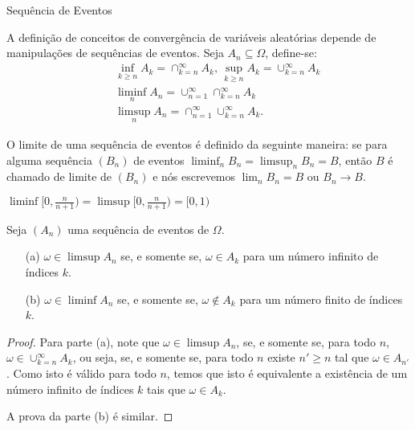 \begin{frame}
\begin{block}{Sequência de Eventos}
	
	A definição de conceitos de convergência de variáveis aleatórias
	depende de manipulações de sequências de eventos. Seja $A_n\subseteq
	\Omega$, define-se:
	\begin{eqnarray}
	& &\inf_{k\geq n} A_k=\cap_{k=n}^{\infty}A_k\mbox{, }\sup_{k\geq
		n}A_k=\cup_{k=n}^{\infty}A_k \nonumber \\ & &\liminf_{n}
	A_n=\cup_{n=1}^{\infty}\cap_{k=n}^{\infty}A_k \nonumber \\
	& & \limsup_{n} A_n=\cap_{n=1}^{\infty}\cup_{k=n}^{\infty}A_k.
	\nonumber
	\end{eqnarray}
	
\end{block}


\begin{block}{}
O limite de uma sequência de eventos é definido da seguinte maneira:
se para alguma sequência $(B_n)$ de eventos $\liminf_{n}
B_n=\limsup_{n} B_n=B$, então $B$ é chamado de limite de $(B_n)$ e
nós escrevemos $\lim_n B_n=B$ ou $B_n \rightarrow B$.
\end{block}

\begin{exem}
	$\liminf [0,\frac{n}{n+1})=\limsup [0,\frac{n}{n+1})=[0,1)$
\end{exem}

\end{frame}

\begin{frame}


\begin{teo} \label{thm:seqeve1} Seja $(A_n)$ uma sequência de eventos de
$\Omega$.
\begin{enumerate}
\item[(a)] $\omega\in \limsup A_n$ se, e somente se, $\omega\in A_k$
para um número infinito de índices $k$.

\item[(b)] $\omega\in \liminf A_n$ se, e somente se, $\omega\notin A_k$
para um número finito de índices $k$.
\end{enumerate}
\end{teo}

\begin{proof} Para parte (a), note que $\omega\in \limsup A_n$, se, e somente
se, para todo $n$, $\omega\in \cup_{k=n}^{\infty}A_k$, ou seja, se,
e somente se, para todo $n$ existe $n'\geq n$ tal que $\omega \in
A_{n'}$. Como isto é válido para todo $n$, temos que isto é
equivalente a existência de um número infinito de índices $k$ tais
que $\omega\in A_k$.

A prova da parte (b) é similar. \end{proof}

\end{frame}

